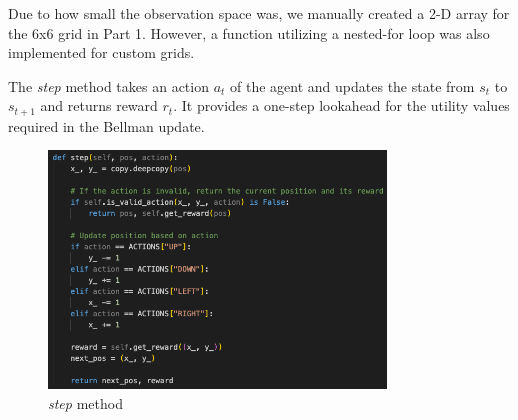 \noindent Due to how small the observation space was, we manually created a 2-D array for the 6x6 grid in Part 1. However, a function utilizing a nested-for loop was also implemented for custom grids.\vspace{10pt}

\noindent The \textit{step} method takes an action $a_t$ of the agent and updates the state from $s_t$ to $s_{t+1}$ and returns reward $r_t$. It provides a one-step lookahead for the utility values required in the Bellman update.

\begin{figure}[H]
    \centering
    \includegraphics[width=0.8\textwidth]{images/step.png}
    \caption{\textit{step} method }
\end{figure}